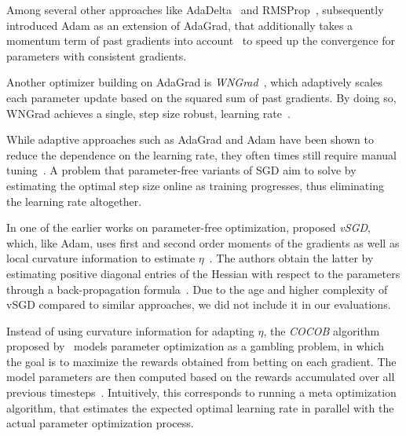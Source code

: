 \documentclass[letterpaper]{article} %
\begin{document}
Among several other approaches like AdaDelta~\cite[see e.g.]{zeilerADADELTAAdaptiveLearning2012a} and RMSProp~\cite{tielemanLecture5rmspropDivide2012}, \citet{kingmaAdamMethodStochastic2017b} subsequently introduced Adam as an extension of AdaGrad, that additionally takes a momentum term of past gradients into account~\cite[see]{sutskeverImportanceInitializationMomentum2013} to speed up the convergence for parameters with consistent gradients.

Another optimizer building on AdaGrad is \textit{WNGrad}~\cite{wuWNGradLearnLearning2020}, which adaptively scales each parameter update based on the squared sum of past gradients.
By doing so, WNGrad achieves a single, step size robust, learning rate~\cite{wuWNGradLearnLearning2020}.

While adaptive approaches such as AdaGrad and Adam have been shown to reduce the dependence on the learning rate, they often times still require manual tuning~\cite{wuWNGradLearnLearning2020}.
A problem that parameter-free variants of SGD aim to solve by estimating the optimal step size online as training progresses, thus eliminating the learning rate altogether.

In one of the earlier works on parameter-free optimization, \citet{schaulNoMorePesky2013} proposed \textit{vSGD}, which, like Adam, uses first and second order moments of the gradients as well as local curvature information to estimate $\eta$~\cite{schaulNoMorePesky2013}.
The authors obtain the latter by estimating positive diagonal entries of the Hessian with respect to the parameters through a back-propagation formula~\cite{schaulNoMorePesky2013}.
Due to the age and higher complexity of vSGD compared to similar approaches, we did not include it in our evaluations.

Instead of using curvature information for adapting $\eta$, the \textit{COCOB} algorithm proposed by~\citet{orabonaTrainingDeepNetworks2017} models parameter optimization as a gambling problem, in which the goal is to maximize the rewards obtained from betting on each gradient.
The model parameters are then computed based on the rewards accumulated over all previous timesteps~\cite{orabonaTrainingDeepNetworks2017}.
Intuitively, this corresponds to running a meta optimization algorithm, that estimates the expected optimal learning rate in parallel with the actual parameter optimization process.
\end{document}
